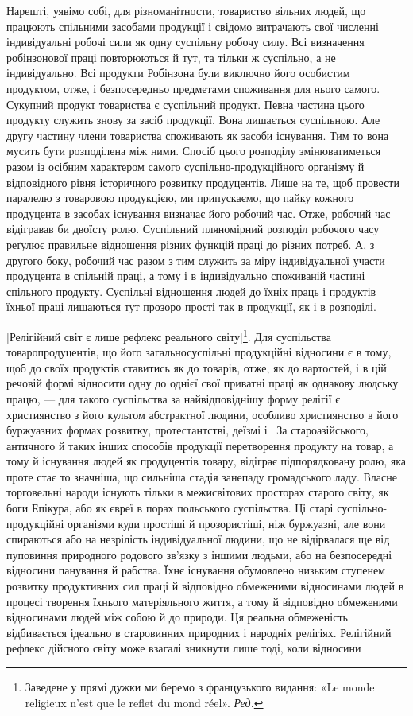Нарешті, уявімо собі, для різноманітности, товариство вільних
людей, що працюють спільними засобами продукції і свідомо
витрачають свої численні індивідуальні робочі сили як одну суспільну
робочу силу. Всі визначення робінзонової праці повторюються
й тут, та тільки ж суспільно, а не індивідуально. Всі продукти Робінзона були виключно його
особистим продуктом, отже, і безпосередньо предметами споживання для нього самого. Сукупний продукт
товариства є суспільний продукт. Певна частина
цього продукту служить знову за засіб продукції. Вона лишається суспільною. Але другу частину члени
товариства споживають як засоби існування. Тим то вона мусить бути розподілена між ними. Спосіб
цього розподілу змінюватиметься разом із осібним характером самого суспільно-продукційного організму
й відповідного рівня історичного розвитку продуцентів. Лише на те, щоб провести паралелю з товаровою
продукцією, ми припускаємо, що пайку кожного продуцента в засобах існування визначає його робочий
час. Отже, робочий час відігравав би двоїсту ролю. Суспільний пляномірний розподіл робочого часу
реґулює правильне відношення різних функцій праці до різних потреб. А, з другого боку, робочий час
разом з тим служить за міру індивідуальної участи продуцента в спільній праці, а тому і в
індивідуально споживаній частині спільного продукту. Суспільні відношення людей до їхніх праць і
продуктів їхньої праці лишаються тут прозоро прості так в продукції, як і в розподілі.

[Релігійний світ є лише рефлекс реального світу]\footnote*{
Заведене у прямі дужки ми беремо з французького видання: «Le monde religieux n’est que le reflet
du mond réel». \emph{Ред.}
}. Для суспільства товаропродуцентів, що його
загальносуспільні продукційні відносини є в тому, щоб до своїх продуктів ставитись як до товарів,
отже, як до вартостей, і в цій речовій формі відносити одну до однієї свої приватні праці як
однакову людську працю, — для такого суспільства за найвідповіднішу форму релігії є християнство з
його культом абстрактної людини, особливо християнство в його буржуазних формах розвитку,
протестантстві, деїзмі і~ За староазійського, античного й таких інших способів продукції
перетворення продукту на товар, а тому й існування людей як продуцентів товару, відіграє
підпорядковану ролю, яка проте стає то значніша, що сильніша стадія занепаду громадського ладу.
Власне торговельні народи існують тільки в межисвітових просторах старого світу, як боги Епікура,
або як євреї в порах польського суспільства. Ці старі суспільно-продукційні організми куди простіші
й прозористіші, ніж буржуазні, але вони спираються або на незрілість індивідуальної людини, що не
відірвалася ще від пуповиння природного родового зв’язку з іншими людьми, або на безпосередні
відносини панування й рабства. Їхнє існування обумовлено низьким ступенем розвитку продуктивних сил
праці й відповідно обмеженими відносинами людей в процесі творення їхнього матеріяльного життя, а
тому й відповідно обмеженими відносинами людей між собою й до природи. Ця реальна обмеженість
відбивається ідеально в старовинних природних і народніх релігіях. Релігійний рефлекс дійсного світу
може взагалі зникнути лише тоді, коли відносини
\parbreak{}  %
